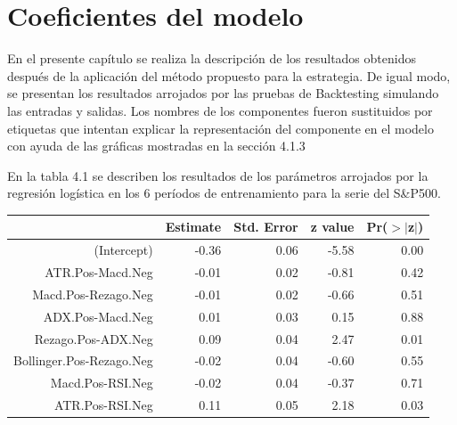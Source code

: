 \documentclass[a4paper,12pt]{Latex/Classes/PhDthesisPSnPDF}
\begin{document}


\newpage

\section{Coeficientes del modelo}

En el presente capítulo se realiza la descripción de los resultados obtenidos después de la aplicación del método propuesto para la estrategia. De igual modo, se presentan los resultados arrojados por las pruebas de Backtesting simulando las entradas y salidas. Los nombres de los componentes fueron sustituidos por etiquetas que intentan explicar la representación del componente en el modelo con ayuda de las gráficas mostradas en la sección 4.1.3


En la tabla 4.1 se describen los resultados de los parámetros arrojados por la regresión logística en los 6 períodos de entrenamiento para la serie del S\&P500.

\begin{center}
\begin{table}[ht]
\centering
\begin{tabular}{rrrrr}
  \hline
 & Estimate & Std. Error & z value & Pr($>$$|$z$|$) \\ 
  \hline
(Intercept) & -0.36 & 0.06 & -5.58 & 0.00 \\ 
  ATR.Pos-Macd.Neg & -0.01 & 0.02 & -0.81 & 0.42 \\ 
  Macd.Pos-Rezago.Neg & -0.01 & 0.02 & -0.66 & 0.51 \\ 
  ADX.Pos-Macd.Neg & 0.01 & 0.03 & 0.15 & 0.88 \\ 
  Rezago.Pos-ADX.Neg & 0.09 & 0.04 & 2.47 & 0.01 \\ 
  Bollinger.Pos-Rezago.Neg & -0.02 & 0.04 & -0.60 & 0.55 \\ 
  Macd.Pos-RSI.Neg & -0.02 & 0.04 & -0.37 & 0.71 \\ 
  ATR.Pos-RSI.Neg & 0.11 & 0.05 & 2.18 & 0.03 \\ 
   \hline
\end{tabular}
\end{table}\end{center}
\end{document}

